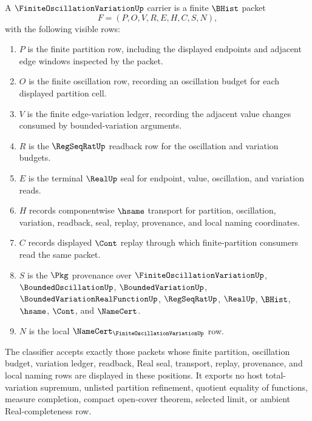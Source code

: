 \begin{definition}
\label{def:finite-oscillation-variation-carrier}
A $\FiniteOscillationVariationUp$ carrier is a finite $\BHist$ packet
$$
F=(P,O,V,R,E,H,C,S,N),
$$
with the following visible rows:
\begin{enumerate}
\item $P$ is the finite partition row, including the displayed endpoints and adjacent edge windows inspected by the packet.
\item $O$ is the finite oscillation row, recording an oscillation budget for each displayed partition cell.
\item $V$ is the finite edge-variation ledger, recording the adjacent value changes consumed by bounded-variation arguments.
\item $R$ is the $\RegSeqRatUp$ readback row for the oscillation and variation budgets.
\item $E$ is the terminal $\RealUp$ seal for endpoint, value, oscillation, and variation reads.
\item $H$ records componentwise $\hsame$ transport for partition, oscillation, variation, readback, seal, replay, provenance, and local naming coordinates.
\item $C$ records displayed $\Cont$ replay through which finite-partition consumers read the same packet.
\item $S$ is the $\Pkg$ provenance over $\FiniteOscillationVariationUp$, $\BoundedOscillationUp$, $\BoundedVariationUp$, $\BoundedVariationRealFunctionUp$, $\RegSeqRatUp$, $\RealUp$, $\BHist$, $\hsame$, $\Cont$, and $\NameCert$.
\item $N$ is the local $\NameCert_{\FiniteOscillationVariationUp}$ row.
\end{enumerate}
The classifier accepts exactly those packets whose finite partition, oscillation budget, variation ledger, readback, Real seal, transport, replay, provenance, and local naming rows are displayed in these positions. It exports no host total-variation supremum, unlisted partition refinement, quotient equality of functions, measure completion, compact open-cover theorem, selected limit, or ambient Real-completeness row.
\end{definition}


